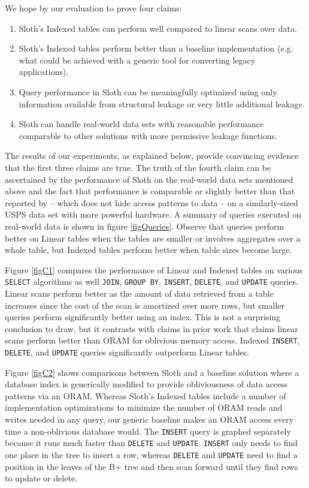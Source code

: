\documentclass[USenglish,oneside,twocolumn]{article}
\def\name/{Sloth}
\begin{document}
We hope by our evaluation to prove four claims:
\begin{enumerate}
\item \name/'s Indexed tables can perform well compared to linear scans over data.

\item \name/'s Indexed tables perform better than a baseline implementation (e.g. what could be achieved with a generic tool for converting legacy applications).

\item Query performance in \name/ can be meaningfully optimized using only information available from structural leakage or very little additional leakage.

\item \name/ can handle real-world data sets with reasonable performance comparable to other solutions with more permissive leakage functions.
\end{enumerate}
The results of our experiments, as explained below, provide convincing evidence that the first three claims are true. The truth of the fourth claim can be ascertained by the performance of \name/ on the real-world data sets mentioned above and the fact that performance is comparable or slightly better than that reported by \cite{DPP+16} -- which does not hide access patterns to data --  on a similarly-sized USPS data set with more powerful hardware. A summary of queries executed on real-world data is shown in figure \ref{figQueries}. Observe that queries perform better on Linear tables when the tables are smaller or involves aggregates over a whole table, but Indexed tables perform better when table sizes become large. 

Figure \ref{figC1} compares the performance of Linear and Indexed tables on various \texttt{SELECT} algorithms as well \texttt{JOIN}, \texttt{GROUP BY}, \texttt{INSERT}, \texttt{DELETE}, and \texttt{UPDATE} queries. Linear scans perform better as the amount of data retrieved from a table increases since the cost of the scan is amortized over more rows, but smaller queries perform significantly better using an index. This is not a surprising conclusion to draw, but it contrasts with claims in prior work \cite{RLT15} that claims linear scans perform better than ORAM for oblivious memory access. Indexed \texttt{INSERT}, \texttt{DELETE}, and \texttt{UPDATE} queries significantly outperform Linear tables. 

Figure \ref{figC2} shows comparisons between \name/ and a baseline solution where a database index is generically modified to provide obliviousness of data access patterns via an ORAM. Whereas \name/'s Indexed tables include a number of implementation optimizations to minimize the number of ORAM reads and writes needed in any query, our generic baseline makes an ORAM access every time a non-oblivious database would. The \texttt{INSERT} query is graphed separately because it runs much faster than \texttt{DELETE} and \texttt{UPDATE}. \texttt{INSERT} only needs to find one place in the tree to insert a row, whereas \texttt{DELETE} and \texttt{UPDATE} need to find a position in the leaves of the B+ tree and then scan forward until they find rows to update or delete. 
\end{document}
